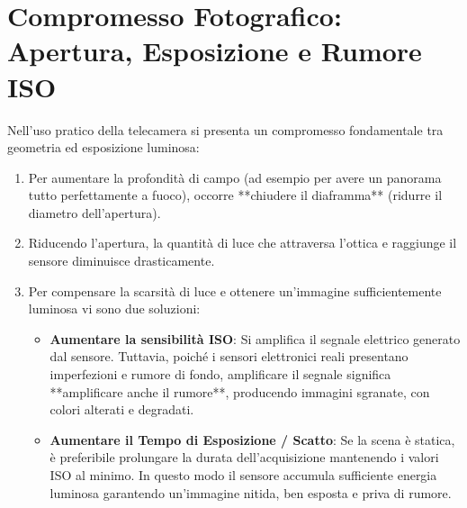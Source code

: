 \section{Compromesso Fotografico: Apertura, Esposizione e Rumore ISO}
Nell'uso pratico della telecamera si presenta un compromesso fondamentale tra geometria ed esposizione luminosa:
\begin{enumerate}
    \item Per aumentare la profondità di campo (ad esempio per avere un panorama tutto perfettamente a fuoco), occorre **chiudere il diaframma** (ridurre il diametro dell'apertura).
    \item Riducendo l'apertura, la quantità di luce che attraversa l'ottica e raggiunge il sensore diminuisce drasticamente.
    \item Per compensare la scarsità di luce e ottenere un'immagine sufficientemente luminosa vi sono due soluzioni:
    \begin{itemize}
        \item \textbf{Aumentare la sensibilità ISO}: Si amplifica il segnale elettrico generato dal sensore. Tuttavia, poiché i sensori elettronici reali presentano imperfezioni e rumore di fondo, amplificare il segnale significa **amplificare anche il rumore**, producendo immagini sgranate, con colori alterati e degradati.
        \item \textbf{Aumentare il Tempo di Esposizione / Scatto}: Se la scena è statica, è preferibile prolungare la durata dell'acquisizione mantenendo i valori ISO al minimo. In questo modo il sensore accumula sufficiente energia luminosa garantendo un'immagine nitida, ben esposta e priva di rumore.
    \end{itemize}
\end{enumerate}
